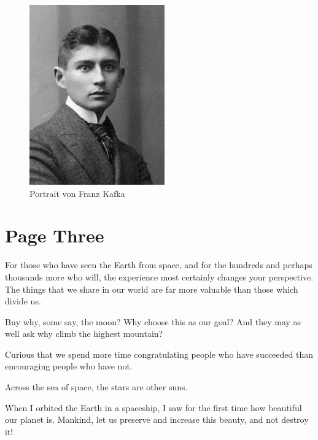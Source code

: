 \begin{figure}[tbph]
	\centering
	\includegraphics[width=0.7\linewidth]{./figures/kafka}
	\caption[Kafka]{Portrait von Franz Kafka}
	\label{fig:kafka}
\end{figure}


\newpage

\section{Page Three}\label{sec:page_three}

For those who have seen the Earth from space, and for the hundreds and perhaps thousands more who will, the experience most certainly changes your perspective. The things that we share in our world are far more valuable than those which divide us.

Buy why, some say, the moon? Why choose this as our goal? And they may as well ask why climb the highest mountain?

Curious that we spend more time congratulating people who have succeeded than encouraging people who have not.

Across the sea of space, the stars are other suns.

When I orbited the Earth in a spaceship, I saw for the first time how beautiful our planet is. Mankind, let us preserve and increase this beauty, and not destroy it!


